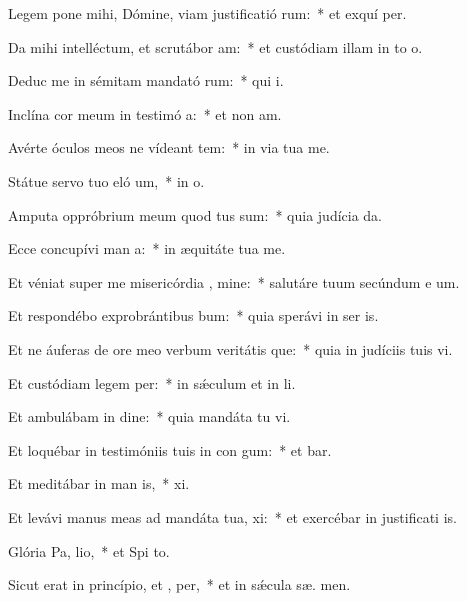 \item Legem pone mihi, Dómine, viam justificatió rum:~* et exquí  per.
\item Da mihi intelléctum, et scrutábor  am:~* et custódiam illam in to  o.
\item Deduc me in sémitam mandató rum:~* qui  i.
\item Inclína cor meum in testimó a:~* et non  am.
\item Avérte óculos meos ne vídeant tem:~* in via tua  me.
\item Státue servo tuo eló um,~* in  o.
\item Amputa oppróbrium meum quod tus sum:~* quia judícia  da.
\item Ecce concupívi man a:~* in æquitáte tua  me.
\item Et véniat super me misericórdia , mine:~* salutáre tuum secúndum e um.
\item Et respondébo exprobrántibus  bum:~* quia sperávi in ser is.
\item Et ne áuferas de ore meo verbum veritátis que:~* quia in judíciis tuis vi.
\item Et custódiam legem  per:~* in sǽculum et in  li.
\item Et ambulábam in dine:~* quia mandáta tu vi.
\item Et loquébar in testimóniis tuis in con gum:~* et  bar.
\item Et meditábar in man is,~*  xi.
\item Et levávi manus meas ad mandáta tua,  xi:~* et exercébar in justificati is.
\item Glória Pa,  lio,~* et Spi to.
\item Sicut erat in princípio, et ,  per,~* et in sǽcula sæ. men.
